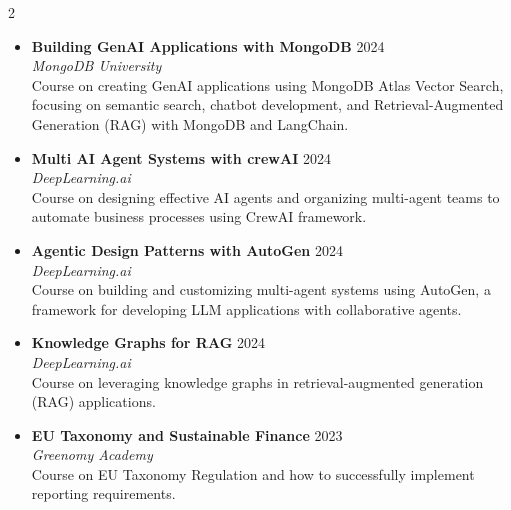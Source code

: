 
\begin{cventries}
\begin{multicols}{2}
\raggedright
\footnotesize
\begin{itemize}[leftmargin=*, nosep, label={}]
  \item \textbf{Building GenAI Applications with MongoDB} \hfill {\color{awesome-skyblue} 2024} \\
  \textit{MongoDB University} \\
  Course on creating GenAI applications using MongoDB Atlas Vector Search, focusing on semantic search, chatbot development, and Retrieval-Augmented Generation (RAG) with MongoDB and LangChain.
  \vspace{2pt}

  \item \textbf{Multi AI Agent Systems with crewAI} \hfill {\color{awesome-skyblue} 2024} \\
  \textit{DeepLearning.ai} \\
  Course on designing effective AI agents and organizing multi-agent teams to automate business processes using CrewAI framework.
  \vspace{2pt}

  \item \textbf{Agentic Design Patterns with AutoGen} \hfill {\color{awesome-skyblue} 2024} \\
  \textit{DeepLearning.ai} \\
  Course on building and customizing multi-agent systems using AutoGen, a framework for developing LLM applications with collaborative agents.
  \vspace{2pt}

  \item \textbf{Knowledge Graphs for RAG} \hfill {\color{awesome-skyblue} 2024} \\
  \textit{DeepLearning.ai} \\
  Course on leveraging knowledge graphs in retrieval-augmented generation (RAG) applications.
  \vspace{2pt}

  \item \textbf{EU Taxonomy and Sustainable Finance} \hfill {\color{awesome-skyblue} 2023} \\
  \textit{Greenomy Academy} \\
  Course on EU Taxonomy Regulation and how to successfully implement reporting requirements.
  \vspace{2pt}


\end{itemize}
\end{multicols}
\end{cventries}
